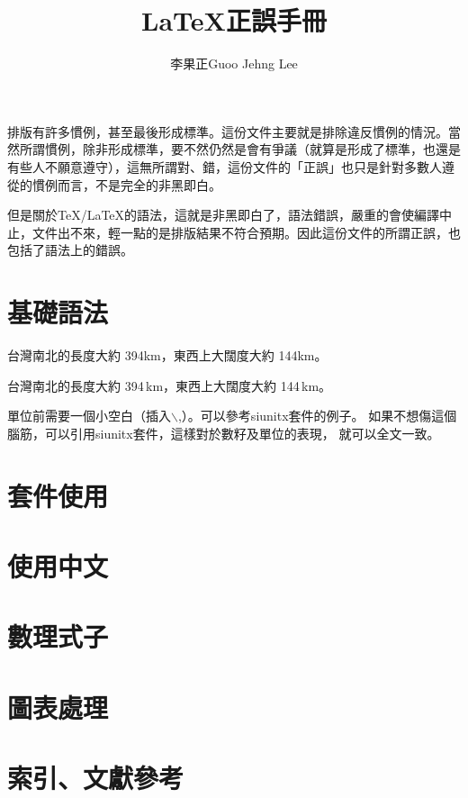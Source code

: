 \documentclass[11pt,a4paper]{article}
\title{\textsf{\textbf{\LaTeX 正誤手冊}}}
\author{李果正Guoo Jehng Lee}
\date{\zhtoday}
\begin{document}
\maketitle
排版有許多慣例，甚至最後形成標準。這份文件主要就是排除違反慣例的情況。當然所謂慣例，除非形成標準，要不然仍然是會有爭議（就算是形成了標準，也還是有些人不願意遵守），這無所謂對、錯，這份文件的「正誤」也只是針對多數人遵從的慣例而言，不是完全的非黑即白。

但是關於\TeX/\LaTeX 的語法，這就是非黑即白了，語法錯誤，嚴重的會使編譯中止，文件出不來，輕一點的是排版結果不符合預期。因此這份文件的所謂正誤，也包括了語法上的錯誤。

\section{基礎語法}


\begin{Wrong}
台灣南北的長度大約 394km，東西上大闊度大約 144km。
\end{Wrong}

\begin{Right}
台灣南北的長度大約 394\,km，東西上大闊度大約 144\,km。
\end{Right}

單位前需要一個小空白（插入$\backslash$,）。可以參考{\sf siunitx}套件的例子。
如果不想傷這個腦筋，可以引用{\sf siunitx}套件，這樣對於數籽及單位的表現，
就可以全文一致。

\section{套件使用}

\section{使用中文}

\section{數理式子}

\section{圖表處理}

\section{索引、文獻參考}
\end{document}
